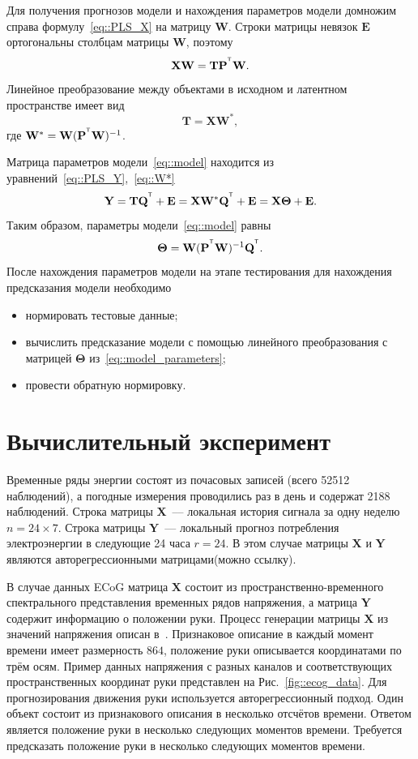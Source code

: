 \documentclass[12pt,twoside]{article}
\newcommand{\bY}{\mathbf{Y}}
\newcommand{\bX}{\mathbf{X}}
\newcommand{\bP}{\mathbf{P}}
\newcommand{\bT}{\mathbf{T}}
\newcommand{\bQ}{\mathbf{Q}}
\newcommand{\bE}{\mathbf{E}}
\newcommand{\bW}{\mathbf{W}}
\newcommand{\bTheta}{\boldsymbol{\Theta}}
\newcommand{\T}{^{\text{\tiny\sffamily\upshape\mdseries T}}}
\begin{document}
Для получения прогнозов модели и нахождения параметров модели 
домножим справа формулу~\eqref{eq::PLS_X} на матрицу $\bW$. Строки матрицы невязок $\bE$ ортогональны столбцам матрицы $\bW$, поэтому 
\[
	\bX \bW = \bT \bP^{\T} \bW.
\] 
Линейное преобразование между объектами в исходном и латентном пространстве имеет вид
\begin{equation}
	\bT = \bX \bW^*,
	\label{eq::W*}
\end{equation}
где $\bW^* = \bW (\bP^{\T} \bW)^{-1}$. 

Матрица параметров модели~\ref{eq::model} находится из уравнений~\eqref{eq::PLS_Y},~\eqref{eq::W*}
\begin{equation*}
    \bY = \bT \bQ^{\T} + \bE = \bX \bW^* \bQ^{\T} + \bE = \bX \bTheta + \bE.
\end{equation*}
Таким образом, параметры модели~\eqref{eq::model} равны
\begin{equation}
    \bTheta = \bW (\bP^{\T} \bW)^{-1} \bQ^{\T}.
    \label{eq::model_parameters}
\end{equation}
После нахождения параметров модели на этапе тестирования для нахождения предсказания модели необходимо
\begin{itemize}
	\item нормировать тестовые данные;	
	\item вычислить предсказание модели с помощью линейного преобразования с матрицей $\bTheta$ из~\eqref{eq::model_parameters};
	\item провести обратную нормировку.
\end{itemize}

\section{Вычислительный эксперимент}
Временные ряды энергии состоят из почасовых записей (всего 52512 наблюдений), а погодные измерения проводились раз в день и содержат 2188 наблюдений. 
Строка матрицы $\bX$~--– локальная история сигнала за одну неделю $n = 24 \times 7$. Строка матрицы $\bY$~--- локальный прогноз потребления электроэнергии в следующие 24 часа $r = 24$. В этом случае матрицы $\bX$ и $\bY$ являются авторегрессионными матрицами(можно ссылку).

В случае данных ECoG матрица $\bX$ состоит из пространственно-временного спектрального представления временных рядов напряжения, а матрица $\bY$ содержит информацию о положении руки. 
Процесс генерации матрицы $\bX$ из значений напряжения описан в~\cite{gasanov2017pls}. 
Признаковое описание в каждый момент времени имеет размерность $864$, положение руки описывается координатами по трём осям. 
Пример данных напряжения с разных каналов и соответствующих пространственных координат руки представлен на Рис.~\ref{fig::ecog_data}.
Для прогнозирования движения руки используется авторегрессионный подход.
Один объект состоит из признакового описания в несколько отсчётов времени. 
Ответом является положение руки в несколько следующих моментов времени.
Требуется предсказать положение руки в несколько следующих моментов времени.
\end{document}
